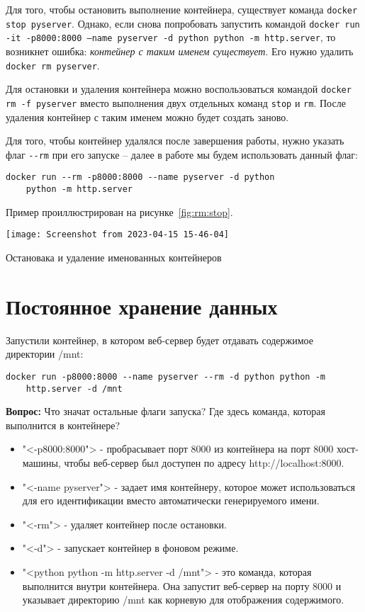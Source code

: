 Для того, чтобы остановить выполнение контейнера, существует команда
\texttt{docker stop pyserver}. Однако, если снова попробовать запустить
командой \texttt{docker run -it -p8000:8000 --name pyserver -d python
python -m http.server}, то возникнет ошибка:
\textit{контейнер с таким именем существует}.
Его нужно удалить \texttt{docker rm pyserver}.\par
Для остановки и удаления контейнера можно воспользоваться командой
\texttt{docker rm -f pyserver} вместо выполнения двух отдельных команд
\texttt{stop} и \texttt{rm}. После удаления контейнер с таким именем можно
будет создать заново.\par
Для того, чтобы контейнер удалялся после завершения работы, нужно указать
флаг \verb|--rm| при его запуске -- далее в работе мы будем использовать
данный флаг:

\begin{verbatim}
docker run --rm -p8000:8000 --name pyserver -d python
	python -m http.server
\end{verbatim}

Пример проиллюстрирован на рисунке~\ref{fig:rm:stop}.

\begin{image}
	\texttt{[image: Screenshot from 2023-04-15 15-46-04]}
	\caption{Остановака и удаление именованных контейнеров}
	\label{fig:rm:stop}
\end{image}

\section{Постоянное хранение данных}
Запустили контейнер, в котором веб-сервер будет отдавать
содержимое директории /mnt:

\begin{verbatim}
docker run -p8000:8000 --name pyserver --rm -d python python -m
	http.server -d /mnt
\end{verbatim}

\textbf{Вопрос:} Что значат остальные флаги запуска? Где здесь команда,
которая выполнится в контейнере?\par

\begin{itemize}
	\item "<-p8000:8000"> - пробрасывает порт 8000 из контейнера на порт
		8000 хост-машины, чтобы веб-сервер был доступен по адресу
		http://localhost:8000.
	\item "<-name pyserver"> - задает имя контейнеру, которое может
		использоваться для его идентификации вместо автоматически
		генерируемого имени.
	\item "<-rm"> - удаляет контейнер после остановки.
	\item "<-d"> - запускает контейнер в фоновом режиме.
	\item "<python python -m http.server -d /mnt"> - это команда,
		которая выполнится внутри контейнера. Она запустит веб-сервер
		на порту 8000 и указывает директорию /mnt как корневую
		для отображения содержимого.
\end{itemize}

